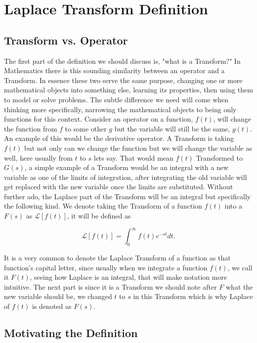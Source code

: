 \documentclass[12pt]{article}
\newcommand{\lp}{\mathscr{L}}
\begin{document}
\section{Laplace Transform Definition}

\subsection{Transform vs. Operator}

The first part of the definition we should discuss is, "what is a Transform?" In Mathematics there is this sounding similarity between an operator and a Transform. In essence these two serve the same purpose, changing one or more mathematical objects into something else, learning its properties, then using them to model or solve problems. The subtle difference we need will come when thinking more specifically, narrowing the mathematical objects to being only functions for this context. Consider an operator on a function, $f(t)$, will change the function from $f$ to some other $g$ but the variable will still be the same, $g(t)$. An example of this would be the derivative operator. A Transform is taking $f(t)$ but not only can we change the function but we will change the variable as well, here usually from $t$ to $s$ lets say. That would mean $f(t)$ Transformed to $G(s)$, a simple example of a Transform would be an integral with a new variable as one of the limits of integration, after integrating the old variable will get replaced with the new variable once the limits are substituted. Without further ado, the Laplace part of the Transform will be an integral but specifically the following kind. We denote taking the Transform of a function $f(t)$ into a $F(s)$ as $\lp [f(t)]$, it will be defined as

\begin{equation*}
    \lp[f(t)] = \int_0^{\infty} f(t) e^{-st} dt.
\end{equation*}

It is a very common to denote the Laplace Transform of a function as that function's capital letter, since usually when we integrate a function $f(t)$, we call it $F(t)$, seeing how Laplace is an integral, that will make notation more intuitive. The next part is since it is a Transform we should note after $F$ what the new variable should be, we changed $t$ to $s$ in this Transform which is why Laplace of $f(t)$ is denoted as $F(s)$.

\subsection{Motivating the Definition}
\end{document}

